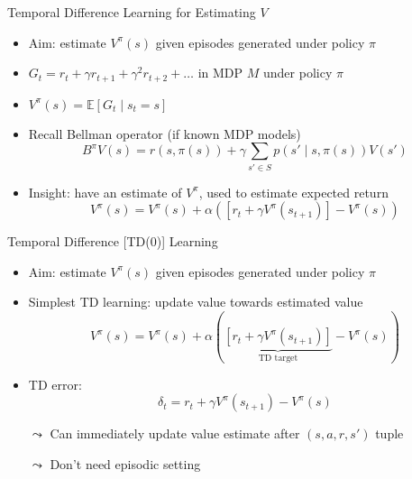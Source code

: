 \documentclass[aspectratio=169]{../latex_main/tntbeamer}  %
\begin{document}
\begin{frame}[c]{Temporal Difference Learning for Estimating $V$}

\begin{itemize}
	\item Aim: estimate $V^\pi(s)$ given episodes generated under policy $\pi$
	\item $G_t = r_t + \gamma r_{t+1} + \gamma^2 r_{t+2} + \ldots$  in MDP $M$ under policy $\pi$
	\item $V^\pi(s) = \mathbb{E}[G_t \mid s_t = s]$
	\smallskip
	\pause
	\item Recall Bellman operator (if known MDP models)
	$$B^\pi V(s) = r(s,\pi(s)) + \gamma \sum_{s'\in S} p(s'\mid s, \pi(s)) V(s')$$
	\pause
	\item Insight: have an estimate of $V^\pi$, used to estimate expected return
	$$ V^\pi(s) = V^\pi(s) + \alpha ([r_t + \gamma V^\pi (s_{t+1})] - V^\pi(s))$$
\end{itemize}


\end{frame}
\begin{frame}[c]{Temporal Difference [TD(0)] Learning}
	
	\begin{itemize}
		\item Aim: estimate $V^\pi(s)$ given episodes generated under policy $\pi$
		\item Simplest TD learning: update value towards estimated value
		$$ V^\pi(s) = V^\pi(s) + \alpha (\underbrace{[r_t + \gamma V^\pi (s_{t+1})]}_{\text{TD target}} - V^\pi(s))$$
		\pause
		\item TD error:
		$$ \delta_t = r_t + \gamma V^\pi(s_{t+1}) - V^\pi (s) $$
		\pause
		\item[$\leadsto$] Can immediately update value estimate after $(s,a,r,s')$ tuple
		\item[$\leadsto$] Don’t need episodic setting
	\end{itemize}
	
\end{frame}
\end{document}
